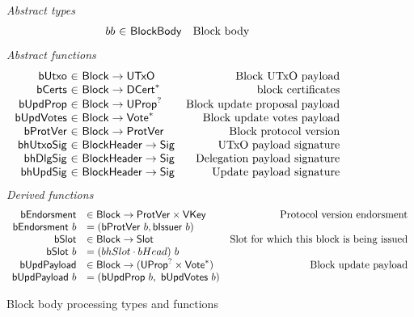 \documentclass[11pt,a4paper]{article}
\newcommand{\fun}[1]{\mathsf{#1}}
\newcommand{\type}[1]{\mathsf{#1}}
\newcommand{\seqof}[1]{#1^{*}}
\newcommand{\totalf}{\to}
\newcommand{\Slot}{\type{Slot}}
\newcommand{\Block}{\type{Block}}
\newcommand{\DCert}{\type{DCert}}
\newcommand{\VKey}{\type{VKey}}
\newcommand{\Sig}{\type{Sig}}
\newcommand{\bcertsname}{bCerts}
\newcommand{\bissuername}{bIssuer}
\newcommand{\bissuer}[1]{\fun{\bissuername} ~ #1}
\begin{document}
\begin{figure}[ht]
  \emph{Abstract types}
  \begin{equation*}
    \begin{array}{r@{~\in~}lr}
      bb & \Bbody & \text{Block body} \\

    \end{array}
  \end{equation*}
  \emph{Abstract functions}
  \begin{equation*}
    \begin{array}{r@{~\in~}lr}
      \fun{bUtxo} & \Block \totalf \UTxO & \text{Block UTxO payload} \\
      \fun{\bcertsname} & \Block \totalf \seqof{\DCert}
                                         & \text{block certificates} \\
      \fun{bUpdProp} & \Block \totalf \UProp^{?} & \text{Block update proposal payload} \\
      \fun{bUpdVotes} & \Block \totalf \seqof{\Vote} & \text{Block update votes payload} \\
      \fun{bProtVer} & \Block \totalf \ProtVer & \text{Block protocol version} \\
      \fun{bhUtxoSig} & \Bhead \totalf \Sig & \text{UTxO payload signature} \\
      \fun{bhDlgSig} & \Bhead \totalf \Sig & \text{Delegation payload signature} \\
      \fun{bhUpdSig} & \Bhead \totalf \Sig & \text{Update payload signature} \\
    \end{array}
  \end{equation*}
  \emph{Derived functions}
  \begin{equation*}
    \begin{array}{rlr}
      \fun{bEndorsment} & \in \Block \to \ProtVer \times \VKey & \text{Protocol version endorsment} \\
      \bendorsment{b} & = (\bprotver{b}, \bissuer{b}) \\
      \fun{\bslotname} & \in \Block \to \Slot & \text{Slot for which this block is being issued} \\
      \bslot{b} & = (\bhslotname \cdot \bheadname)~b \\
      \fun{\bupdpayloadname} & \in \Block \to (\UProp^{?}\times\seqof{\Vote}) & \text{Block update payload} \\
      \bupdpayload{b} & = (\bupdprop{b},~\bupdvotes{b})
    \end{array}
  \end{equation*}
  \caption{Block body processing types and functions}
  \label{fig:defs:bbody}
\end{figure}
\end{document}
